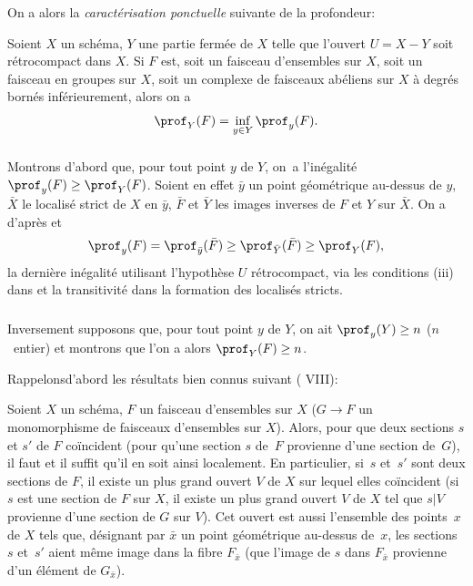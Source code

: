 On a alors la \textit{caract\'erisation ponctuelle} suivante de la profondeur:

\begin{theoreme} \label{XIV.1.8} Soient $X$ un sch\'ema, $Y$ une partie ferm\'ee de $X$ telle que l'ouvert $U=X-Y$ soit r\'etrocompact dans $X$. Si $F$ est, soit un faisceau d'ensembles sur $X$, soit un faisceau en groupes sur $X$, soit un complexe de faisceaux ab\'eliens sur $X$ \`a degr\'es born\'es inf\'erieurement, alors on a
$$
\prof_Y(F)=\inf_{y\in Y} \prof_y(F).
$$
\end{theoreme}

\subsubsection{} \label{XIV.1.8.1} Montrons d'abord que, pour tout point $y$ de $Y$, on~a l'in\'egalit\'e $\prof_y(F)\geq \prof_Y(F)$. Soient en effet $\bar y$ un point g\'eom\'etrique au-dessus de $y$, $\bar X$ le localis\'e strict de $X$ en $\bar y$, $\bar F$ et $\bar Y$ les images inverses de $F$ et $Y$ sur $\bar X$. On a d'apr\`es  et 
$$
\prof_y(F)=\prof_{\bar y}(\bar F)\geq \prof_{\bar Y}(\bar F)\geq \prof_Y(F),
$$
la derni\`ere in\'egalit\'e utilisant l'hypoth\`ese \og $U$ r\'etrocompact\fg, via les conditions \textup{(iii)} dans  et la transitivit\'e dans la formation des localis\'es stricts.

\subsubsection{} \label{XIV.1.8.2}
Inversement supposons que, pour tout point $y$ de $Y$, on ait $\prof_y(Y)\geq n$ ($n$~entier) et montrons que l'on a alors $\prof_Y(F)\geq n$.

Rappelons\pageoriginale d'abord les r\'esultats bien connus suivant \textup{( VIII)}:

\begin{subsublemme} \label{XIV.1.8.2.1}
Soient $X$ un sch\'ema, $F$ un faisceau d'ensembles sur $X$ (\resp $G\to F$ un monomorphisme de faisceaux d'ensembles sur $X$). Alors, pour que deux sections $s$ et $s'$ de $F$ co\"incident (\resp pour qu'une section $s$ de~$F$ provienne d'une section de~$G$), il faut et il suffit qu'il en soit ainsi localement. En particulier, si~$s$ et~$s'$ sont deux sections de $F$, il existe un plus grand ouvert $V$ de $X$ sur lequel elles co\"incident (\resp si $s$ est une section de $F$ sur $X$, il existe un plus grand ouvert $V$ de $X$ tel que $s|V$ provienne d'une section de $G$ sur $V$). Cet ouvert est aussi l'ensemble des points~$x$ de $X$ tels que, d\'esignant par $\bar x$ un point g\'eom\'etrique au-dessus de~$x$, les sections~$s$ et~$s'$ aient m\^eme image dans la fibre $F_{\bar x}$ (\resp que l'image de $s$ dans $F_{\bar x}$ provienne d'un \'el\'ement de $G_{\bar x}$).
\end{subsublemme}

